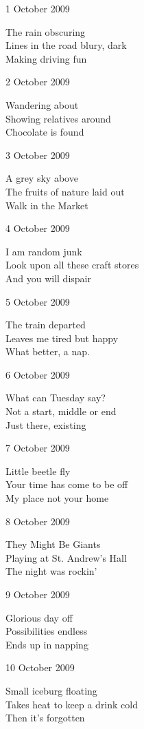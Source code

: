 \documentclass[12pt]{article}
\begin{document}
1 October 2009

The rain obscuring \\
Lines in the road blury, dark \\
Making driving fun

2 October 2009

Wandering about \\
Showing relatives around \\
Chocolate is found

3 October 2009

A grey sky above \\
The fruits of nature laid out \\
Walk in the Market

\newpage

4 October 2009

I am random junk \\
Look upon all these craft stores \\
And you will dispair

5 October 2009

The train departed \\
Leaves me tired but happy \\
What better, a nap.

6 October 2009

What can Tuesday say? \\
Not a start, middle or end \\
Just there, existing

7 October 2009

Little beetle fly \\
Your time has come to be off \\
My place not your home

8 October 2009

They Might Be Giants \\
Playing at St. Andrew's Hall \\
The night was rockin'

9 October 2009

Glorious day off \\
Possibilities endless \\
Ends up in napping

10 October 2009

Small iceburg floating \\
Takes heat to keep a drink cold \\
Then it's forgotten

\newpage
\end{document}

